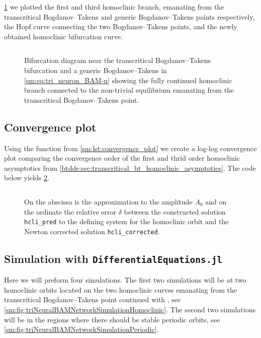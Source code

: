 \cref{sm:fig:triNeuronBAMNeuralNetworkModelConnectionHomoclinicParameters} we plotted the first and third homoclinic branch, emanating from the
transcritical Bogdanov--Takens and generic Bogdanov--Takens points
respectively, the Hopf curve connecting the two Bogdanov--Takens points, and
the newly obtained homoclinic bifurcation curve.
\inputminted[firstline=501, lastline=529]{MATLAB}{\pathToDDEBifToolDemos/BAM_neural_network_model/BAMnn.m}
\begin{figure}[ht]
    \centering
    \caption{
    Bifurcation diagram near the transcritical Bogdanov--Takens bifurcation and
    a generic Bogdanov--Takens in \cref{sm:eq:tri_neuron_BAM-u} showing the fully
    continued homoclinic branch connected to the non-trivial equilibrium emanating
    from the transcritical Bogdanov--Takens point.}
    \label{sm:fig:triNeuronBAMNeuralNetworkModelConnectionHomoclinicParameters}
\end{figure}


\subsection{Convergence plot}
\label{sm:sec:tri_neuron_BAM:convergence_plot}
Using the function from \cref{sm:lst:convergence_plot} we create a log-log
convergence plot comparing the convergence order of the first and thrid order
homoclinic asymptotics from \cref{btdde:sec:transcritical_bt_homoclinic_asymptotics}.
The code below yields \cref{sm:fig:triNeuralBAMNetworkModelConvergencePlot}.
\inputminted[firstline=531, lastline=542]{MATLAB}{\pathToDDEBifToolDemos/BAM_neural_network_model/BAMnn.m}
\begin{figure}[ht]
    \centering
     \caption{On the abscissa is the approximation to the amplitude $A_0$ and on
        the ordinate the relative error $\delta$ between the constructed solution
        \texttt{hcli_pred} to the defining system for the homoclinic orbit
        and the Newton corrected solution \texttt{hcli_corrected}.}
    \label{sm:fig:triNeuralBAMNetworkModelConvergencePlot}
\end{figure}

\subsection{Simulation with {\tt DifferentialEquations.jl}}
\label{sm:sec:triNeuralBAMNetworkModelSimulation}
Here we will preform four simulations. The first two simulations will be at two
homoclinic orbits located on the two homoclinic curves emanating from the
transcritical Bogdanov--Takens point continued with \DDEBIFTOOL, see
\cref{sm:fig:triNeuralBAMNetworkSimulationHomoclinic}. The second two simulations will be in
the regions where there should be stable periodic orbits, see
\cref{sm:fig:triNeuralBAMNetworkSimulationPeriodic}.

